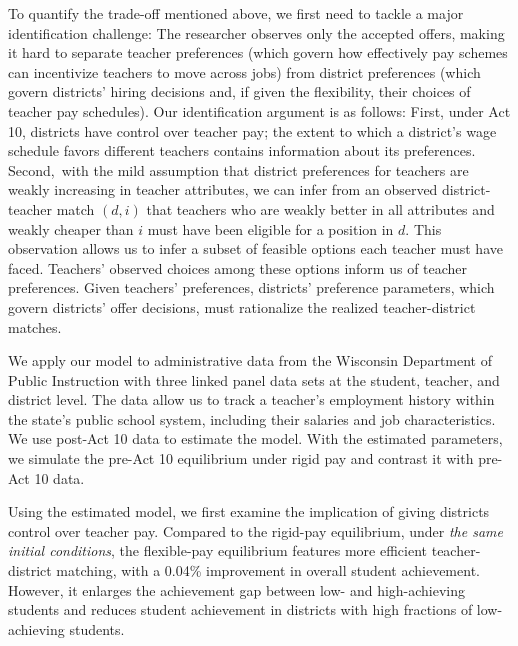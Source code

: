\documentclass[notitlepage,12pt]{article}%
\begin{document}
To quantify the trade-off mentioned above, we first need to tackle a major
identification challenge: The researcher observes only the accepted offers,
making it hard to separate teacher preferences (which govern how effectively
pay schemes can incentivize teachers to move across jobs) from district
preferences (which govern districts' hiring decisions and, if given the
flexibility, their choices of teacher pay schedules). Our identification
argument is as follows: First, under Act 10, districts have control over
teacher pay; the extent to which a district's wage schedule favors different
teachers contains information about its preferences. Second,\ with the mild
assumption that district preferences for teachers are weakly increasing in
teacher attributes, we can infer from an observed district-teacher match
$(d,i)$ that teachers who are weakly better in all attributes and weakly
cheaper than $i$ must have been eligible for a position in $d$. This
observation allows us to infer a subset of feasible options each teacher must
have faced. Teachers' observed choices among these options inform us of
teacher preferences. Given teachers' preferences, districts' preference
parameters, which govern districts' offer decisions, must rationalize the
realized teacher-district matches.

We apply our model to administrative data from the Wisconsin Department of
Public Instruction with three linked panel data sets at the student, teacher,
and district level. The data allow us to track a teacher's employment history
within the state's public school system, including their salaries and job
characteristics. We use post-Act 10 data to estimate the model. With the estimated parameters, we simulate the pre-Act 10 
equilibrium under rigid pay and contrast it with pre-Act 10 data.

Using the estimated model, we first examine the implication of giving
districts control over teacher pay. Compared to the rigid-pay equilibrium,
under \emph{the same initial conditions}, the flexible-pay equilibrium
features more efficient teacher-district matching, with a 0.04\% improvement
in overall student achievement. However, it enlarges the achievement gap
between low- and high-achieving students and reduces student achievement in
districts with high fractions of low-achieving students.
\end{document}
